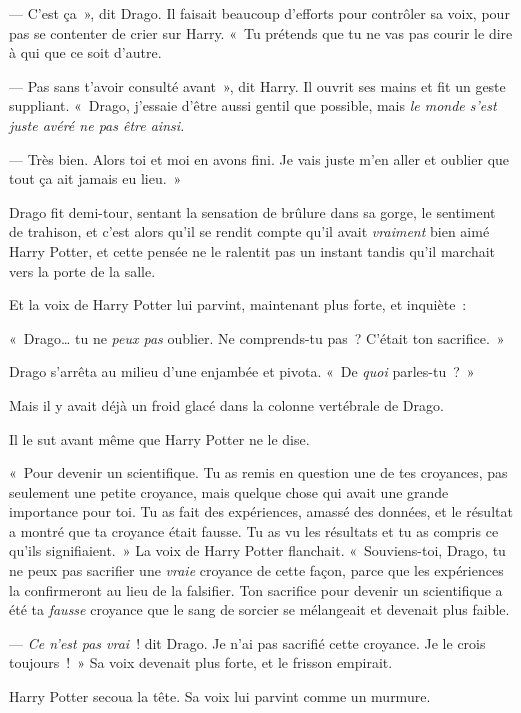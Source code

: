 --- C'est ça~», dit Drago. Il faisait beaucoup d'efforts pour contrôler sa voix, pour pas se contenter de crier sur Harry. «~Tu prétends que tu ne vas pas courir le dire à qui que ce soit d'autre.

--- Pas sans t'avoir consulté avant~», dit Harry. Il ouvrit ses mains et fit un geste suppliant. «~Drago, j'essaie d'être aussi gentil que possible, mais \emph{le monde s'est juste avéré ne pas être ainsi.}

--- Très bien. Alors toi et moi en avons fini. Je vais juste m'en aller et oublier que tout ça ait jamais eu lieu.~»

Drago fit demi-tour, sentant la sensation de brûlure dans sa gorge, le sentiment de trahison, et c'est alors qu'il se rendit compte qu'il avait \emph{vraiment} bien aimé Harry Potter, et cette pensée ne le ralentit pas un instant tandis qu'il marchait vers la porte de la salle.

Et la voix de Harry Potter lui parvint, maintenant plus forte, et inquiète~:

«~Drago… tu ne \emph{peux pas} oublier. Ne comprends-tu pas~? C'était ton sacrifice.~»

Drago s'arrêta au milieu d'une enjambée et pivota. «~De \emph{quoi} parles-tu~?~»

Mais il y avait déjà un froid glacé dans la colonne vertébrale de Drago.

Il le sut avant même que Harry Potter ne le dise.

«~Pour devenir un scientifique. Tu as remis en question une de tes croyances, pas seulement une petite croyance, mais quelque chose qui avait une grande importance pour toi. Tu as fait des expériences, amassé des données, et le résultat a montré que ta croyance était fausse. Tu as vu les résultats et tu as compris ce qu'ils signifiaient.~» La voix de Harry Potter flanchait. «~Souviens-toi, Drago, tu ne peux pas sacrifier une \emph{vraie} croyance de cette façon, parce que les expériences la confirmeront au lieu de la falsifier. Ton sacrifice pour devenir un scientifique a été ta \emph{fausse} croyance que le sang de sorcier se mélangeait et devenait plus faible.

--- \emph{Ce n'est pas vrai}~! dit Drago. Je n'ai pas sacrifié cette croyance. Je le crois toujours~!~» Sa voix devenait plus forte, et le frisson empirait.

Harry Potter secoua la tête. Sa voix lui parvint comme un murmure.

